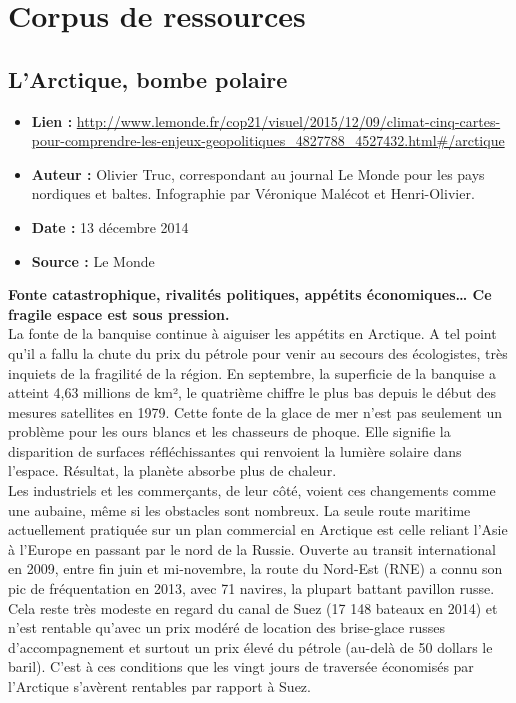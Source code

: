 \documentclass[8pt]{article}
\begin{document}
\section{Corpus de ressources}


\subsection{L’Arctique, bombe polaire }

\begin{itemize}
	\item \textbf{Lien : }  \url{http://www.lemonde.fr/cop21/visuel/2015/12/09/climat-cinq-cartes-pour-comprendre-les-enjeux-geopolitiques_4827788_4527432.html#/arctique} 
	\item \textbf{Auteur : }  Olivier Truc, correspondant au journal Le Monde pour les pays nordiques et baltes.	Infographie par Véronique Malécot et Henri-Olivier.
	\item \textbf{Date : } 13 décembre 2014
	\item \textbf{Source : } Le Monde
\end{itemize}

\textbf{Fonte catastrophique, rivalités politiques, appétits économiques… Ce fragile espace est sous pression.}\\

La fonte de la banquise continue à aiguiser les appétits en Arctique. A tel point qu’il a fallu la chute du prix du pétrole pour venir au secours des écologistes, très inquiets de la fragilité de la région. En septembre, la superficie de la banquise a atteint 4,63 millions de km², le quatrième chiffre le plus bas depuis le début des mesures satellites en 1979. Cette fonte de la glace de mer n’est pas seulement un problème pour les ours blancs et les chasseurs de phoque. Elle signifie la disparition de surfaces réfléchissantes qui renvoient la lumière solaire dans l’espace. Résultat, la planète absorbe plus de chaleur.\\

Les industriels et les commerçants, de leur côté, voient ces changements comme une aubaine, même si les obstacles sont nombreux. La seule route maritime actuellement pratiquée sur un plan commercial en Arctique est celle reliant l’Asie à l’Europe en passant par le nord de la Russie. Ouverte au transit international en 2009, entre fin juin et mi-novembre, la route du Nord-Est (RNE) a connu son pic de fréquentation en 2013, avec 71 navires, la plupart battant pavillon russe. Cela reste très modeste en regard du canal de Suez (17 148 bateaux en 2014) et n’est rentable qu’avec un prix modéré de location des brise-glace russes d’accompagnement et surtout un prix élevé du pétrole (au-delà de 50 dollars le baril). C’est à ces conditions que les vingt jours de traversée économisés par l’Arctique s’avèrent rentables par rapport à Suez. \\
\end{document}

